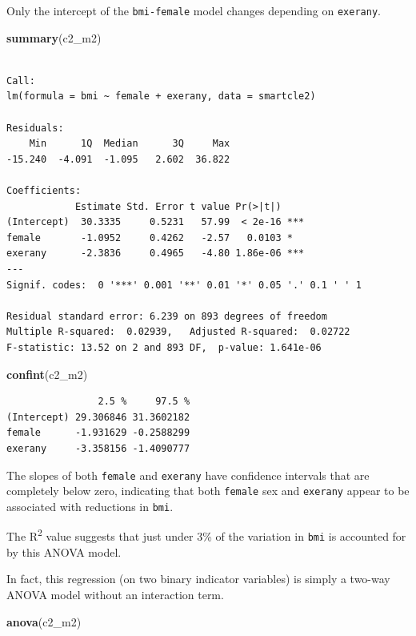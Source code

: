 \documentclass[]{book}
\newenvironment{Shaded}{\begin{snugshade}}{\end{snugshade}}
\newcommand{\KeywordTok}[1]{\textcolor[rgb]{0.13,0.29,0.53}{\textbf{#1}}}
\newcommand{\NormalTok}[1]{#1}
\theoremstyle{definition}
\theoremstyle{definition}
\theoremstyle{definition}
\theoremstyle{remark}
\begin{document}
Only the intercept of the \texttt{bmi-female} model changes depending on
\texttt{exerany}.

\begin{Shaded}
\begin{Highlighting}[]
\KeywordTok{summary}\NormalTok{(c2_m2)}
\end{Highlighting}
\end{Shaded}

\begin{verbatim}

Call:
lm(formula = bmi ~ female + exerany, data = smartcle2)

Residuals:
    Min      1Q  Median      3Q     Max 
-15.240  -4.091  -1.095   2.602  36.822 

Coefficients:
            Estimate Std. Error t value Pr(>|t|)    
(Intercept)  30.3335     0.5231   57.99  < 2e-16 ***
female       -1.0952     0.4262   -2.57   0.0103 *  
exerany      -2.3836     0.4965   -4.80 1.86e-06 ***
---
Signif. codes:  0 '***' 0.001 '**' 0.01 '*' 0.05 '.' 0.1 ' ' 1

Residual standard error: 6.239 on 893 degrees of freedom
Multiple R-squared:  0.02939,   Adjusted R-squared:  0.02722 
F-statistic: 13.52 on 2 and 893 DF,  p-value: 1.641e-06
\end{verbatim}

\begin{Shaded}
\begin{Highlighting}[]
\KeywordTok{confint}\NormalTok{(c2_m2)}
\end{Highlighting}
\end{Shaded}

\begin{verbatim}
                2.5 %     97.5 %
(Intercept) 29.306846 31.3602182
female      -1.931629 -0.2588299
exerany     -3.358156 -1.4090777
\end{verbatim}

The slopes of both \texttt{female} and \texttt{exerany} have confidence
intervals that are completely below zero, indicating that both
\texttt{female} sex and \texttt{exerany} appear to be associated with
reductions in \texttt{bmi}.

The R\textsuperscript{2} value suggests that just under 3\% of the
variation in \texttt{bmi} is accounted for by this ANOVA model.

In fact, this regression (on two binary indicator variables) is simply a
two-way ANOVA model without an interaction term.

\begin{Shaded}
\begin{Highlighting}[]
\KeywordTok{anova}\NormalTok{(c2_m2)}
\end{Highlighting}
\end{Shaded}
\end{document}
